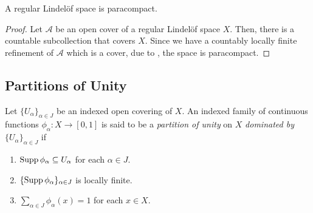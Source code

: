 \begin{proposition}
    A regular Lindel\"of space is paracompact.
\end{proposition}
\begin{proof}
    Let $\mathscr A$ be an open cover of a regular Lindel\"of space $X$. Then, there is a countable subcollection that covers $X$. Since we have a countably locally finite refinement of $\mathscr A$ which is a cover, due to , the space is paracompact.
\end{proof}


\subsection{Partitions of Unity}

\begin{definition}
    Let $\{U_\alpha\}_{\alpha\in J}$ be an indexed open covering of $X$. An indexed family of continuous functions $\phi_\alpha: X\to[0,1]$ is said to be a \emph{partition of unity} on $X$ \emph{dominated by} $\{U_\alpha\}_{\alpha\in J}$ if 
    \begin{enumerate}[label=(\alph*)]
        \item $\operatorname{Supp}\phi_\alpha\subseteq U_\alpha$ for each $\alpha\in J$.
        \item $\{\operatorname{Supp}\phi_\alpha\}_{\alpha\in J}$ is locally finite. 
        \item $\displaystyle\sum_{\alpha\in J}\phi_\alpha(x) = 1$ for each $x\in X$.
    \end{enumerate}
\end{definition}

